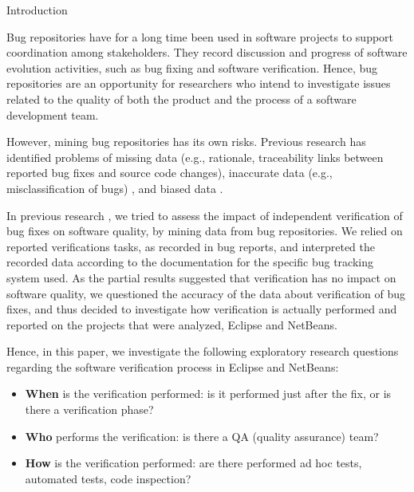 \begin{section}{Introduction}

Bug repositories have for a long time been used in software projects to support coordination among stakeholders. They record discussion and progress of software evolution activities, such as bug fixing and software verification. Hence, bug repositories are an opportunity for researchers who intend to investigate issues related to the quality of both the product and the process of a software development team.


However, mining bug repositories has its own risks. Previous research has identified problems of missing data (e.g., rationale, traceability links between reported bug fixes and source code changes), inaccurate data (e.g., misclassification of bugs) \cite{Aranda2009}, and biased data \cite{Bird2009}. %

  In previous research \cite{Souza2011}, we tried to assess the impact of independent verification of bug fixes on software quality, by mining data from bug repositories. 
  We relied on reported verifications tasks, as recorded in bug reports, and interpreted the recorded data according to the documentation for the specific bug tracking system used.
  As the partial results suggested that verification has no impact on software quality, we questioned the accuracy of the data about verification of bug fixes, and thus decided to investigate how verification is actually performed and reported on the projects that were analyzed, Eclipse and NetBeans.
	
	Hence, in this paper, we investigate the following exploratory research questions regarding the software verification process in Eclipse and NetBeans:

	\begin{itemize}
		\item \textbf{When} is the verification performed: is it performed just after the fix, or is there a verification phase?
		\item \textbf{Who} performs the verification: is there a QA (quality assurance) team? 		
		\item \textbf{How} is the verification performed: are there performed ad hoc tests, automated tests, code inspection?
	\end{itemize}


\end{section}
